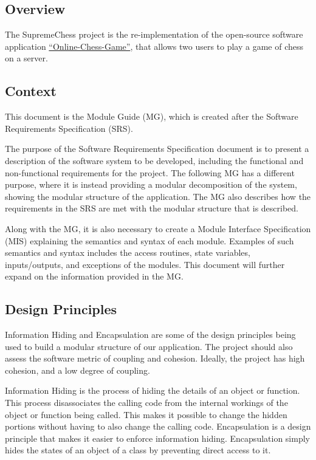 \documentclass[12pt, titlepage]{article}
\begin{document}
\subsection{Overview}

The SupremeChess project is the re-implementation of the open-source software application \href{https://github.com/techwithtim/Online-Chess-Game}{``Online-Chess-Game''}, that allows two users to play a game of chess on a server.

\subsection{Context}

This document is the Module Guide (MG), which is created after the Software Requirements Specification (SRS). 

The purpose of the Software Requirements Specification document is to present a description of the software system to be developed, including the functional and non-functional requirements for the project. The following MG has a different purpose, where it is instead providing a modular decomposition of the system, showing the modular structure of the application. The MG also describes how the requirements in the SRS are met with the modular structure that is described.

Along with the MG, it is also necessary to create a Module Interface Specification (MIS) explaining the semantics and syntax of each module. Examples of such semantics and syntax includes the access routines, state variables, inputs/outputs, and exceptions of the modules. This document will further expand on the information provided in the MG.

\subsection{Design Principles}

Information Hiding and Encapsulation are some of the design principles being used to build a modular structure of our application. The project should also assess the software metric of coupling and cohesion. Ideally, the project has high cohesion, and a low degree of coupling.

Information Hiding is the process of hiding the details of an object or function. This process disassociates the calling code from the internal workings of the object or function being called. This makes it possible to change the hidden portions without having to also change the calling code. Encapsulation is a design principle that makes it easier to enforce information hiding. Encapsulation simply hides the states of an object of a class by preventing direct access to it. 
\end{document}
